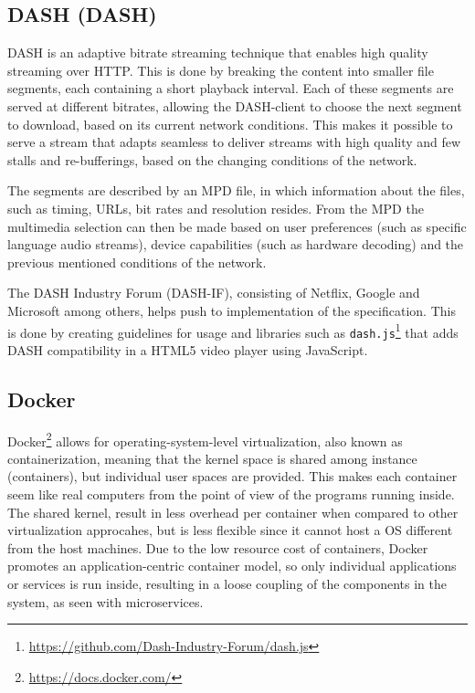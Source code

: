 \subsection{\acl{DASH} (\acs{DASH})}

\ac{DASH} is an adaptive bitrate streaming technique that enables high quality streaming over \acs{HTTP}. This is done by breaking the content into smaller file segments, each containing a short playback interval. Each of these segments are served at different bitrates, allowing the \acs{DASH}-client to choose the next segment to download, based on its current network conditions.
This makes it possible to serve a stream that adapts seamless to deliver streams with high quality and few stalls and re-bufferings, based on the changing conditions of the network.

The segments are described by an \ac{MPD} file, in which information about the files, such as timing, \acs{URL}s, bit rates and resolution resides. From the \acs{MPD} the multimedia selection can then be made based on user preferences (such as specific language audio streams), device capabilities (such as hardware decoding) and the previous mentioned conditions of the network.

The \acs{DASH} Industry Forum (DASH-IF), consisting of Netflix, Google and Microsoft among others, helps push to implementation of the specification\cite{ISO23009}. This is done by creating guidelines for usage and libraries such as \texttt{dash.js}\footnote{\url{https://github.com/Dash-Industry-Forum/dash.js}} that adds \acs{DASH} compatibility in a HTML5 video player using JavaScript.

\subsection{Docker}
Docker\footnote{\url{https://docs.docker.com/}} allows for operating-system-level virtualization, also known as containerization, meaning that the kernel space is shared among instance (containers), but individual user spaces are provided. This makes each container seem like real computers from the point of view of the programs running inside. 
The shared kernel, result in less overhead per container when compared to other virtualization approcahes, but is less flexible since it cannot host a \acs{OS} different from the host machines. Due to the low resource cost of containers, Docker promotes an application-centric container model\cite{merkel2014docker}, so only individual applications or services is run inside, resulting in a loose coupling of the components in the system, as seen with microservices. 

